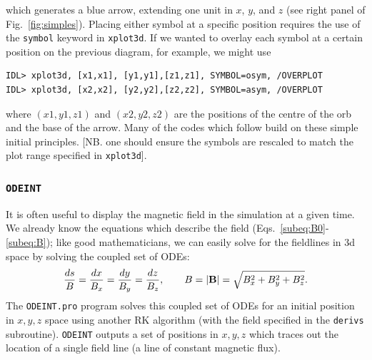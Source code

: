 \documentclass[a4paper,11pt,usenames,dvipsnames]{article}
\begin{document}
which generates a blue arrow, extending one unit in $x$, $y$, and $z$ (see right panel of Fig.~\ref{fig:simples}). Placing either symbol at a specific position requires the use of the  \texttt{symbol} keyword in \texttt{xplot3d}. If we wanted to overlay each symbol at a certain position on the previous diagram, for example, we might use 
\begin{verbatim}
IDL> xplot3d, [x1,x1], [y1,y1],[z1,z1], SYMBOL=osym, /OVERPLOT
IDL> xplot3d, [x2,x2], [y2,y2],[z2,z2], SYMBOL=asym, /OVERPLOT
\end{verbatim}
where $(x1,y1,z1)$ and $(x2,y2,z2)$ are the positions of the centre of the orb and the base of the arrow. Many of the codes which follow build on these simple initial principles. [NB. one should ensure the symbols are rescaled to match the plot range specified in \texttt{xplot3d}].

\subsubsection{\texttt{ODEINT}}
It is often useful to display the magnetic field in the simulation at a given time. We already know the equations which describe the field (Eqs.~\ref{subeq:B0}-\ref{subeq:B}); like good mathematicians, we can easily solve for the fieldlines in 3d space by solving the coupled set of ODEs:
\[
 \frac{ds}{B}= \frac{dx}{B_x}= \frac{dy}{B_y}= \frac{dz}{B_z}, \qquad B=|{\bf{B}}|=\sqrt{B_x^2+B_y^2+B_z^2}.
\]
The \texttt{ODEINT.pro} program solves this coupled set of ODEs for an initial position in $x,y,z$ space using another RK algorithm (with the field specified in the \texttt{derivs} subroutine). \texttt{ODEINT} outputs a set of positions in $x,y,z$ which traces out the location of a single field line (a line of constant magnetic flux).
\end{document}
